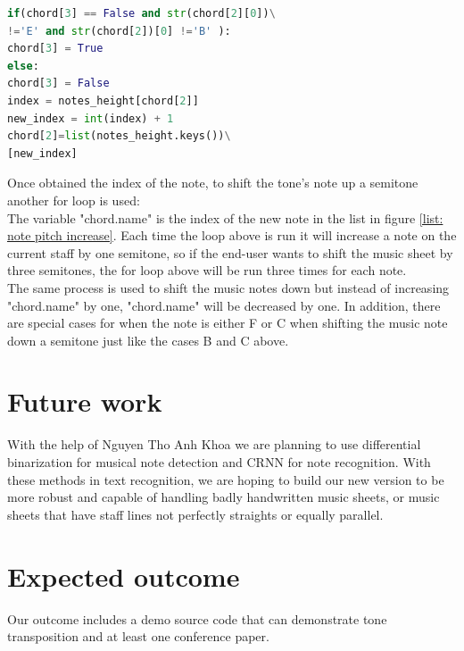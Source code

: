 \documentclass[final]{cvpr}
\begin{document}
\begin{lstlisting}[language=Python]
if(chord[3] == False and str(chord[2][0])\
!='E' and str(chord[2])[0] !='B' ):
chord[3] = True
else:
chord[3] = False
index = notes_height[chord[2]]
new_index = int(index) + 1
chord[2]=list(notes_height.keys())\
[new_index]
\end{lstlisting}

Once obtained the index of the note, to shift the tone's note up a semitone 
another for loop is used:\\


The variable "chord.name" is the index of the new note in the list in figure
\ref{list: note pitch increase}.  Each time the loop above is run it will
increase a note on the current staff by one semitone, so if the end-user wants to shift
the music sheet by three semitones, the for loop above will be run three
times for each note.\\

The same process is used to shift the music notes down but instead of increasing
"chord.name" by one, "chord.name" will be decreased by one. In addition, there are
special cases for when the note is either F or C when shifting the music note
down a semitone just like the cases B and C above.

\section{Future work}
With the help of Nguyen Tho Anh Khoa we are
planning to use differential binarization for musical note detection and CRNN
for note recognition. With these methods in text recognition, we are hoping to
build our new version to be more robust and capable of handling badly handwritten music
sheets, or music sheets that have staff lines not perfectly straights or
equally parallel.\\


\section{Expected outcome}
Our outcome includes a demo source code that can demonstrate tone transposition and at least one conference
paper. 




{\small


}
\end{document}
